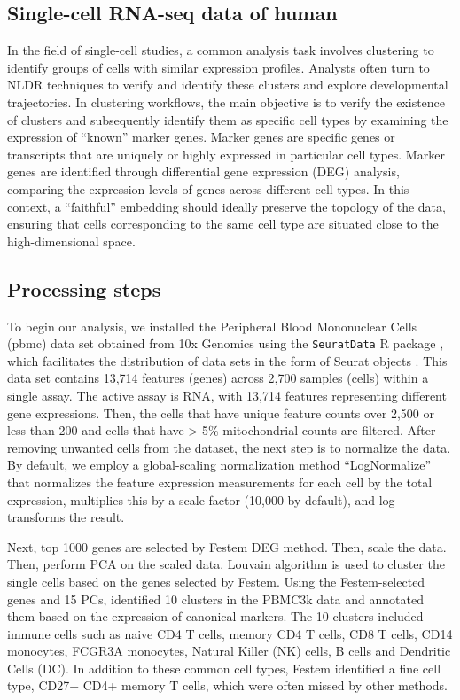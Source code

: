 \documentclass[
  12pt]{article}
\begin{document}
\hypertarget{single-cell-rna-seq-data-of-human}{%
\subsection{Single-cell RNA-seq data of
human}\label{single-cell-rna-seq-data-of-human}}

In the field of single-cell studies, a common analysis task involves
clustering to identify groups of cells with similar expression profiles.
Analysts often turn to NLDR techniques to verify and identify these
clusters and explore developmental trajectories. In clustering
workflows, the main objective is to verify the existence of clusters and
subsequently identify them as specific cell types by examining the
expression of ``known'' marker genes. Marker genes are specific genes or
transcripts that are uniquely or highly expressed in particular cell
types. Marker genes are identified through differential gene expression
(DEG) analysis, comparing the expression levels of genes across
different cell types. In this context, a ``faithful'' embedding should
ideally preserve the topology of the data, ensuring that cells
corresponding to the same cell type are situated close to the
high-dimensional space.

\hypertarget{processing-steps}{%
\subsection{Processing steps}\label{processing-steps}}

To begin our analysis, we installed the Peripheral Blood Mononuclear
Cells (pbmc) data set obtained from 10x Genomics using the
\texttt{SeuratData} R package \citep{Rahul2019}, which facilitates the
distribution of data sets in the form of Seurat objects
\citep{Yuhan2021}. This data set contains 13,714 features (genes) across
2,700 samples (cells) within a single assay. The active assay is RNA,
with 13,714 features representing different gene expressions. Then, the
cells that have unique feature counts over 2,500 or less than 200 and
cells that have \textgreater{} 5\% mitochondrial counts are filtered.
After removing unwanted cells from the dataset, the next step is to
normalize the data. By default, we employ a global-scaling normalization
method ``LogNormalize'' that normalizes the feature expression
measurements for each cell by the total expression, multiplies this by a
scale factor (10,000 by default), and log-transforms the result.

Next, top 1000 genes are selected by Festem \citep{Chen2023} DEG method.
Then, scale the data. Then, perform PCA on the scaled data. Louvain
algorithm is used to cluster the single cells based on the genes
selected by Festem. Using the Festem-selected genes and 15 PCs,
identified 10 clusters in the PBMC3k data and annotated them based on
the expression of canonical markers. The 10 clusters included immune
cells such as naive CD4 T cells, memory CD4 T cells, CD8 T cells, CD14
monocytes, FCGR3A monocytes, Natural Killer (NK) cells, B cells and
Dendritic Cells (DC). In addition to these common cell types, Festem
identified a fine cell type, CD27− CD4+ memory T cells, which were often
missed by other methods.
\end{document}
